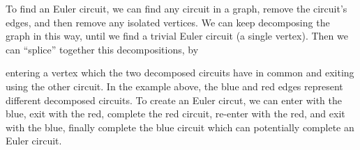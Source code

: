 \documentclass{report}
\begin{document}
To find an Euler circuit, we can find any circuit in a graph, remove the circuit's edges, and then remove any isolated vertices. We can keep decomposing the graph in this way, until we find a trivial Euler circuit (a single vertex). Then we can ``splice'' together this decompositions, by 
\begin{center}
\end{center}
entering a vertex which the two decomposed circuits have in common and exiting using the other circuit. In the example above, the blue and red edges represent different decomposed circuits. To create an Euler circut, we can enter with the blue, exit with the red, complete the red circuit, re-enter with the red, and exit with the blue, finally complete the blue circuit which can potentially complete an Euler circuit.
\end{document}
